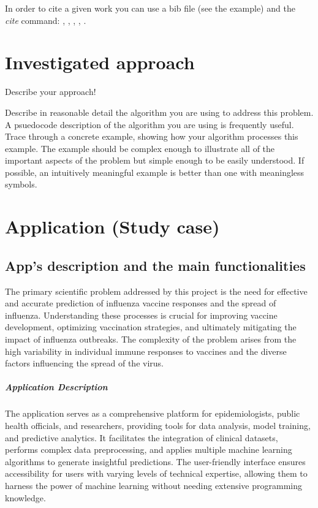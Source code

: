 \documentclass[runningheads,a4paper,11pt]{report}
\begin{document}
In order to cite a given work you can use a bib file (see the example) and the $\ $ \textit{cite} command:
\cite{kennedy1}, \cite{Koh06}, \cite{Berlekamp82}, \cite{Storn95}, \cite{firefox}.



\chapter{Investigated approach}
\label{chapter:proposedApproach}

Describe your approach!

Describe in reasonable detail the algorithm you are using to address this problem. A psuedocode description of the algorithm you are using is frequently useful. Trace through a concrete example, showing how your algorithm processes this example. The example should be complex enough to illustrate all of the important aspects of the problem but simple enough to be easily understood. If possible, an intuitively meaningful example is better than one with meaningless symbols.


\chapter{Application (Study case)}
\label{chapter:application}


\section{App's description  and the main functionalities}
\label{section:appDescription}

The primary scientific problem addressed by this project is the need for effective and accurate prediction of influenza vaccine responses and the spread of influenza. Understanding these processes is crucial for improving vaccine development, optimizing vaccination strategies, and ultimately mitigating the impact of influenza outbreaks. The complexity of the problem arises from the high variability in individual immune responses to vaccines and the diverse factors influencing the spread of the virus. 

\paragraph{Application Description}

The application serves as a comprehensive platform for epidemiologists, public health officials, and researchers, providing tools for data analysis, model training, and predictive analytics. It facilitates the integration of clinical datasets, performs complex data preprocessing, and applies multiple machine learning algorithms to generate insightful predictions. The user-friendly interface ensures accessibility for users with varying levels of technical expertise, allowing them to harness the power of machine learning without needing extensive programming knowledge.
\end{document}

